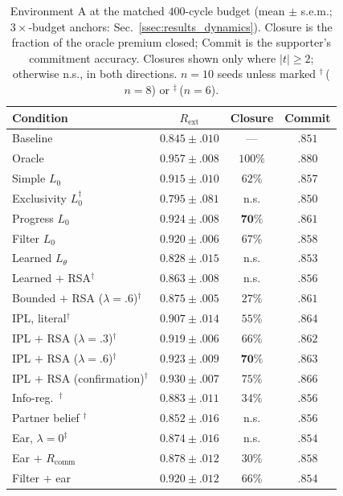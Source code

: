\documentclass[sigconf,review,anonymous]{acmart}
\newcommand{\Rcomm}{R_{\text{comm}}}
\newcommand{\Rext}{R_{\text{ext}}}
\newcommand{\Ltheta}{L_\theta}
\begin{document}
\begin{table}[t]
\centering
\caption{Environment A at the matched $400$-cycle budget (mean $\pm$ s.e.m.; $3\times$-budget anchors: Sec.~\ref{ssec:results_dynamics}). Closure is the fraction of the oracle premium closed; Commit is the supporter's commitment accuracy. Closures shown only where $|t|\ge2$; otherwise n.s., in both directions. $n{=}10$ seeds unless marked $^\dagger${\,}($n{=}8$) or $^\ddagger${\,}($n{=}6$).}
\label{tab:scout}
\footnotesize
\setlength{\tabcolsep}{4pt}
\begin{tabular}{@{}>{\raggedright\arraybackslash}p{}ccc@{}}
\toprule
\textbf{Condition} & $\Rext$ & Closure & Commit \\
\midrule
Baseline & $0.845\pm.010$ & --- & $.851$ \\
Oracle & $0.957\pm.008$ & $100\%$ & $.880$ \\
\midrule
Simple $L_0$ & $0.915\pm.010$ & $62\%$ & $.857$ \\
Exclusivity $L_0^\dagger$ & $0.795\pm.081$ & n.s. & $.850$ \\
Progress $L_0$ & $\mathbf{0.924\pm.008}$ & $\mathbf{70\%}$ & $\mathbf{.861}$ \\
Filter $L_0$ & $0.920\pm.006$ & $67\%$ & $.858$ \\
\midrule
Learned $\Ltheta$ & $0.828\pm.015$ & n.s. & $.853$ \\
Learned $+$ RSA$^\dagger$ & $0.863\pm.008$ & n.s. & $.856$ \\
Bounded $+$ RSA ($\lambda{=}.6$)$^\dagger$ & $0.875\pm.005$ & $27\%$ & $.861$ \\
\midrule
IPL, literal$^\dagger$ & $0.907\pm.014$ & $55\%$ & $.864$ \\
IPL $+$ RSA ($\lambda{=}.3$)$^\dagger$ & $0.919\pm.006$ & $66\%$ & $.862$ \\
IPL $+$ RSA ($\lambda{=}.6$)$^\dagger$ & $\mathbf{0.923\pm.009}$ & $\mathbf{70\%}$ & $\mathbf{.863}$ \\
IPL $+$ RSA (confirmation)$^\dagger$ & $0.930\pm.007$ & $75\%$ & $.866$ \\
\midrule
Info-reg.\ \cite{strouse2018learning}$^\dagger$ & $0.883\pm.011$ & $34\%$ & $.856$ \\
Partner belief \cite{tian2020implicit}$^\dagger$ & $0.852\pm.016$ & n.s. & $.856$ \\
\midrule
Ear, $\lambda{=}0^\ddagger$ & $0.874\pm.016$ & n.s. & $.854$ \\
Ear $+$ $\Rcomm$ & $0.878\pm.012$ & $30\%$ & $.858$ \\
Filter $+$ ear & $0.920\pm.012$ & $66\%$ & $.854$ \\
\bottomrule
\end{tabular}
\end{table}
\end{document}
